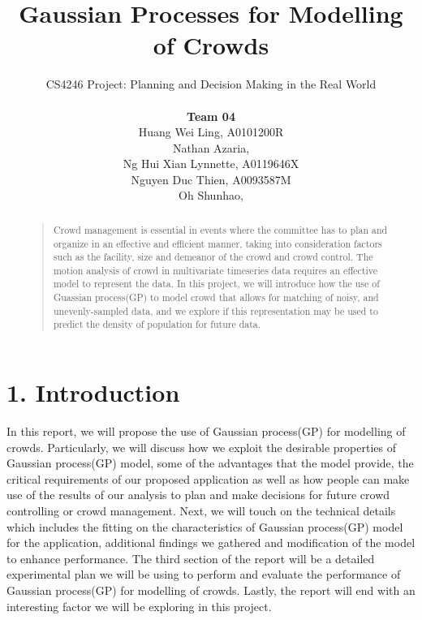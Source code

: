 \documentclass[letterpaper]{article}
\begin{document}
%
\title{Gaussian Processes for Modelling of Crowds}
\author{CS4246 Project: Planning and Decision Making in the Real World  \\ \\
{\bf Team 04} \\
Huang Wei Ling, A0101200R\\
Nathan Azaria, \\
Ng Hui Xian Lynnette, A0119646X\\
Nguyen Duc Thien, A0093587M\\
Oh Shunhao, \\
}
\maketitle
\begin{abstract}
\begin{quote}
Crowd management is essential in events where the committee has to plan and organize in an effective and efficient manner, taking into consideration factors such as the facility, size and demeanor of the crowd and crowd control. The motion analysis of crowd in multivariate timeseries data requires an effective model to represent the data. In this project, we will introduce how the use of Guassian process(GP) to model crowd that allows for matching of noisy, and unevenly-sampled data, and we explore if this representation may be used to predict the density of population for future data.
\end{quote}
\end{abstract}

\section{1.  Introduction}
In this report, we will propose the use of Gaussian process(GP) for modelling of crowds. Particularly, we will discuss how we exploit the desirable properties of Gaussian process(GP) model, some of the advantages that the model provide, the critical requirements of our proposed application as well as how people can make use of the results of our analysis to plan and make decisions for future crowd controlling or crowd management. Next, we will touch on the technical details which includes the fitting on the characteristics of Gaussian process(GP) model for the application, additional findings we gathered and modification of the model to enhance performance. The third section of the report will be a detailed experimental plan we will be using to perform and evaluate the performance of Gaussian process(GP) for modelling of crowds. Lastly, the report will end with an interesting factor we will be exploring in this project.
\end{document}
